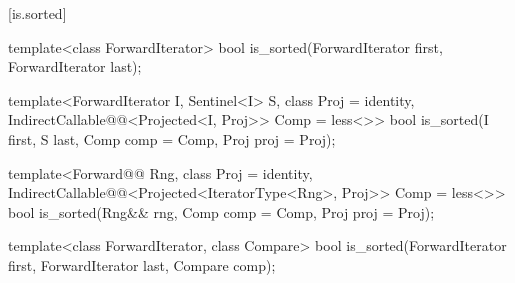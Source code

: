 [is.sorted]{}

%
\begin{removedblock}
\begin{itemdecl}
template<class ForwardIterator>
  bool is_sorted(ForwardIterator first, ForwardIterator last);
\end{itemdecl}
\end{removedblock}
\begin{addedblock}
\begin{itemdecl}
template<ForwardIterator I, Sentinel<I> S, class Proj = identity,
    IndirectCallable@@<Projected<I, Proj>> Comp = less<>>
  bool is_sorted(I first, S last, Comp comp = Comp{}, Proj proj = Proj{});

template<Forward@@ Rng, class Proj = identity,
    IndirectCallable@@<Projected<IteratorType<Rng>, Proj>> Comp = less<>>
  bool
    is_sorted(Rng&& rng, Comp comp = Comp{}, Proj proj = Proj{});
\end{itemdecl}
\end{addedblock}

\begin{itemdescr}
\pnum
\returns {}
\end{itemdescr}

\begin{removedblock}
%
\begin{itemdecl}
template<class ForwardIterator, class Compare>
  bool is_sorted(ForwardIterator first, ForwardIterator last,
    Compare comp);
\end{itemdecl}

\begin{itemdescr}
\pnum
\returns {}
\end{itemdescr}
\end{removedblock}

